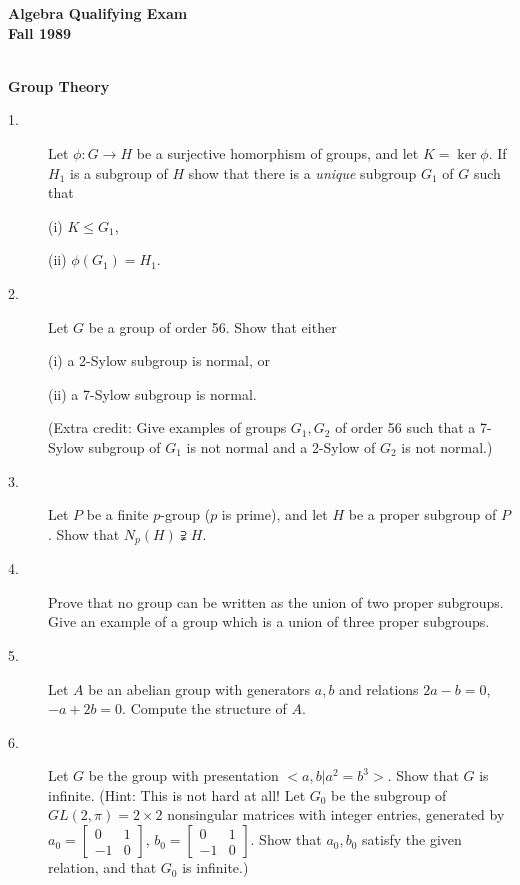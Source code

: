 \documentclass{article}
\begin{document}


\begin{center}\begin{LARGE}
{\bf Algebra Qualifying Exam}\\ 
{\bf Fall 1989}\\ \end{LARGE}
\end{center}
\vspace{0.1in}
\noindent\hrulefill\\
{\bf Group Theory}

\begin{description}
\item[1.]
Let $\phi : G \to H$ be a surjective homorphism of groups, and let
$K=\ker \phi$. If $H_1$ is a subgroup of $H$ show that there is a
{\it unique} subgroup $G_1$ of $G$ such that

\item[\quad] (i)
$K \leq G_1$,

\item[\quad] (ii)
$\phi (G_1) = H_1$.

\item[2.]
Let $G$ be a group of order 56. Show that either

\item[\quad] (i)
a 2-Sylow subgroup is normal, or

\item[\quad] (ii)
a 7-Sylow subgroup is normal.

(Extra credit: Give examples of groups $G_1, G_2$ of order 56 such that a
7-Sylow subgroup of $G_1$ is not normal and a 2-Sylow of $G_2$ is not normal.)

\item[3.]
Let $P$ be a finite $p$-group ($p$ is prime), and let $H$ be a proper
subgroup of $P$. Show that $N_p (H) \supsetneqq H$.

\item[4.]
Prove that no group can be written as the union of two proper subgroups.
Give an example of a group which is a union of three proper subgroups.

\item[5.]
Let $A$ be an abelian group with generators $a,b$ and relations $2a-b=0$,
$-a + 2b = 0$. Compute the structure of $A$.

\item[6.]
Let $G$ be the group with presentation $<a,b |a^2 = b^3>$. Show that $G$ is
infinite. (Hint: This is not hard at all! Let $G_0$ be the subgroup of
$GL(2, \pi) = 2 \times 2$ nonsingular matrices with integer entries,
generated by
$a_0 = \begin{bmatrix} 0&1 \\ -1&0 \end{bmatrix}$,
$b_0 = \begin{bmatrix} 0&1 \\ -1&0 \end{bmatrix}$.
Show that $a_0, b_0$ satisfy the given relation, and that $G_0$ is infinite.)

\end{description}
\end{document}
